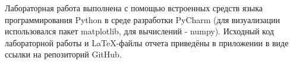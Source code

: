 \documentclass[../body.tex]{subfiles}
\begin{document}
	Лабораторная работа выполнена с помощью встроенных средств языка программирования Python в среде разработки PyCharm (для визуализации использовался пакет matplotlib, для вычислений - numpy). Исходный код лабораторной работы и \LaTeX-файлы отчета приведёны в приложении в виде ссылки на репозиторий GitHub.
	
	
\end{document}
